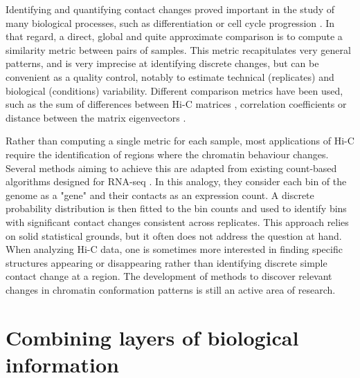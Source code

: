 Identifying and quantifying contact changes proved important in the study of many biological processes, such as differentiation or cell cycle progression \cite{andreySwitchTopologicalDomains2013,lupianezDisruptionsTopologicalChromatin2015,CohesinsCondensinsOrchestrate2017}. In that regard, a direct, global and quite approximate comparison is to compute a similarity metric between pairs of samples. This metric recapitulates very general patterns, and is very imprecise at identifying discrete changes, but can be convenient as a quality control, notably to estimate technical (replicates) and biological (conditions) variability. Different comparison metrics have been used, such as the sum of differences between Hi-C matrices \cite{ursuGenomeDISCOConcordanceScore2018}, correlation coefficients \cite{yangHiCRepAssessingReproducibility2017} or distance between the matrix eigenvectors \cite{yanHiCspectorMatrixLibrary2017}.

Rather than computing a single metric for each sample, most applications of Hi-C require the identification of regions where the chromatin behaviour changes. Several methods aiming to achieve this are adapted from existing count-based algorithms designed for RNA-seq \citep{lunDiffHicBioconductorPackage2015,stansfieldMultiHiCcompareJointNormalization2019,heinzSimpleCombinationsLineageDetermining2010}. In this analogy, they consider each bin of the genome as a "gene" and their contacts as an expression count. A discrete probability distribution is then fitted to the bin counts and used to identify bins with significant contact changes consistent across replicates. This approach relies on solid statistical grounds, but it often does not address the question at hand. When analyzing Hi-C data, one is sometimes more interested in finding specific structures appearing or disappearing rather than identifying discrete simple contact change at a region. The development of methods to discover relevant changes in chromatin conformation patterns is still an active area of research.

\section{Combining layers of biological information}

